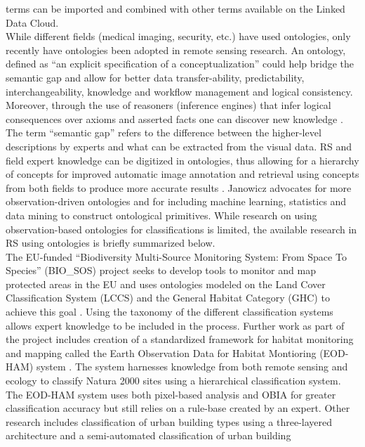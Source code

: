 \documentclass[authoryear, review,12pt,number]{elsarticle}
\begin{document}
terms can be imported and combined with other terms available on the Linked Data
Cloud.
\\
While different fields (medical imaging, security, etc.) have used ontologies,
only recently have ontologies been adopted in remote sensing research. An
ontology, defined  as ``an explicit specification of a conceptualization''
\citep{gruber1993} could help bridge the semantic gap and allow for better data
transfer-ability, predictability, interchangeability, knowledge and workflow
management and logical consistency. Moreover, through the use of reasoners
(inference engines) that infer logical consequences over axioms and asserted 
facts one can discover new knowledge \citep{Arvor2013, Andres2013a}. The term
``semantic gap'' refers to the difference between the higher-level descriptions
by experts and what can be extracted from the visual data. RS and
field expert knowledge can be digitized in ontologies, thus allowing for a
hierarchy of concepts for improved automatic image annotation and retrieval
using concepts from both fields to produce more accurate results
\cite{Srikanth:2005:EOA:1076034.1076128}. Janowicz \cite{Janowicz2012} advocates
for more observation-driven ontologies and for including machine learning,
statistics and data mining to construct ontological primitives. While
research on using observation-based ontologies for classifications is limited,
the available research in RS using ontologies is briefly summarized below.
\\
The EU-funded ``Biodiversity Multi-Source Monitoring System: From Space To
Species'' (BIO\_SOS) project seeks to develop tools to monitor and map protected
areas in the EU and uses ontologies modeled on the Land Cover Classification
System (LCCS) and the General Habitat Category (GHC) to achieve this goal
\citep{Arvor2013}. Using the taxonomy of the different classification systems
allows expert knowledge to be included in the process. Further work as part of
the project includes creation of a standardized
framework for habitat monitoring and mapping called the Earth Observation Data
for Habitat Montioring (EOD-HAM) system \citep{Lucas2015}. The system harnesses
knowledge from both remote sensing and ecology to classify Natura 2000 sites
using a hierarchical classification system. The EOD-HAM system uses both
pixel-based analysis and OBIA for greater classification accuracy but still
relies on a rule-base created by an expert. Other research includes
classification of urban building types using a three-layered architecture
\citep{diSciascio2013} and a semi-automated classification of urban building
\end{document}
